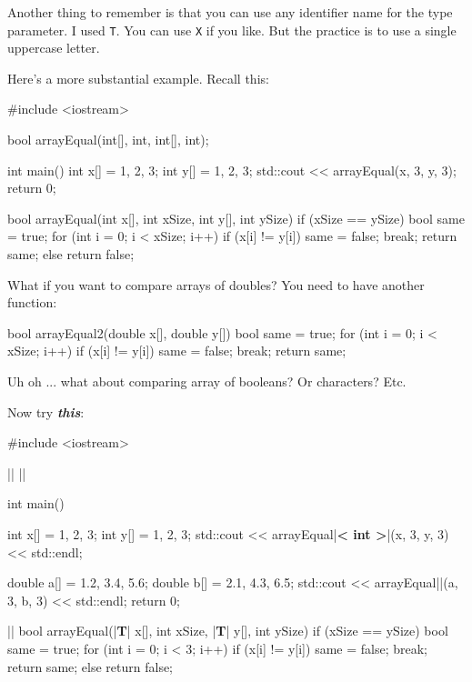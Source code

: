 Another thing to remember is that you can use any identifier name for the type parameter. I used \texttt{T}. You can use \texttt{X} if you like. But the practice is to use a single uppercase letter.





\newpage{}

Here's a more substantial example. Recall this:

\begin{consolethree}[escapeinside=||]
#include <iostream>

bool arrayEqual(int[], int, int[], int);

int main()
{
    int x[] = {1, 2, 3};
    int y[] = {1, 2, 3};
    std::cout << arrayEqual(x, 3, y, 3);
    return 0;
}

bool arrayEqual(int x[], int xSize, int y[], int ySize)
{
    if (xSize == ySize)
    {
        bool same = true;
        for (int i = 0; i < xSize; i++)
        {
            if (x[i] != y[i])
            {
                same = false;
                break;
            }
        }
        return same;
    }
    else
    {
        return false;
    }
}
\end{consolethree}

What if you want to compare arrays of doubles? You need to have another
function:

\begin{consolethree}[escapeinside=||]
bool arrayEqual2(double x[], double y[])
{
    bool same = true;
    for (int i = 0; i < xSize; i++)
    {
        if (x[i] != y[i])
        {
            same = false;
            break;
        }
    }
    return same;
}
\end{consolethree}

Uh oh ... what about comparing array of booleans? Or characters? Etc.

Now try \textbf{\textit{this}}:

\begin{consolethree}[escapeinside=||]
#include <iostream>

||
||

int main()
{
    int x[] = {1, 2, 3};
    int y[] = {1, 2, 3};
    std::cout << arrayEqual|\textbf{< int >}|(x, 3, y, 3)
              << std::endl;

    double a[] = {1.2, 3.4, 5.6};
    double b[] = {2.1, 4.3, 6.5};
    std::cout << arrayEqual||(a, 3, b, 3)
              << std::endl;
    return 0;
}

||
bool arrayEqual(|\textbf{T}| x[], int xSize, |\textbf{T}| y[], int ySize)
{
    if (xSize == ySize)
    {
        bool same = true;
        for (int i = 0; i < 3; i++)
        {
            if (x[i] != y[i])
            {
                same = false;
                break;
            }
        }
        return same;
    }
    else
    {
        return false;
    }
}
\end{consolethree}

